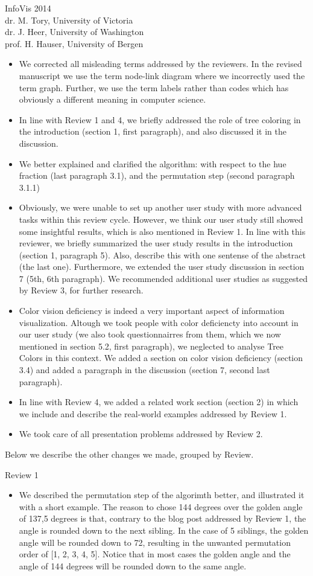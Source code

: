 \documentclass{letter}
\begin{document}
\begin{letter}{InfoVis 2014 \\ dr. M. Tory, University of Victoria \\ dr. J. Heer, University of Washington \\ prof. H. Hauser, University of Bergen}
\begin{itemize}
\item We corrected all misleading terms addressed by the reviewers. In the revised manuscript we use the term node-link diagram where we incorrectly used the term graph. Further, we use the term labels rather than codes which has obviously a different meaning in computer science.
\item In line with Review 1 and 4, we briefly addressed the role of tree coloring in the introduction (section 1, first paragraph), and also discussed it in the discussion.
\item We better explained and clarified the algorithm: with respect to the hue fraction (last paragraph 3.1), and the permutation step (second paragraph 3.1.1)
\item Obviously, we were unable to set up another user study with more advanced tasks within this review cycle. However, we think our user study still showed some insightful results, which is also mentioned in Review 1.  In line with this reviewer, we briefly summarized the user study results in the introduction (section 1, paragraph 5). Also, describe this with one  sentense of the abstract (the last one). Furthermore, we extended the user study discussion in section 7 (5th, 6th paragraph). We recommended additional user studies as suggested by Review 3, for further research.
\item Color vision deficiency is indeed a very important aspect of information visualization. Altough we took people with color deficiencty into account in our user study (we also took
questionnairres from them, which we now mentioned in section 5.2, first paragraph),  we neglected to analyse Tree Colors in this context. We added a section on color vision deficiency (section 3.4) and added a paragraph in the discussion (section 7, second last paragraph).
\item In line with Review 4, we added a related work section (section 2) in which we include and describe the real-world examples addressed by Review 1.
\item We took care of all presentation problems addressed by Review 2.
\end{itemize}

Below we describe the other changes we made, grouped by Review.

Review 1
\begin{itemize}
\item We described the permutation step of the algorimth better, and illustrated it with a short example. The reason to chose 144 degrees over the golden angle of 137,5 degrees is that, contrary to the blog post addressed by Review 1, the angle is rounded down to the next sibling. In the case of 5 siblings, the golden angle will be rounded down to 72, resulting in the unwanted permutation order of [1, 2, 3, 4, 5]. Notice that in most cases the golden angle and the angle of 144 degrees will be rounded down to the same angle.
\end{itemize}


\end{letter}
\end{document}
